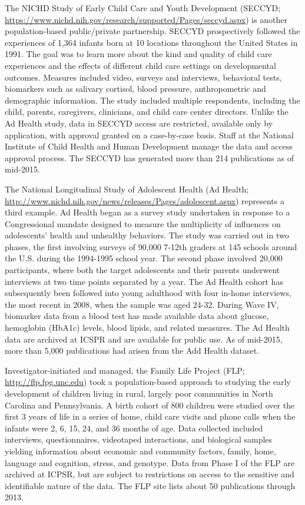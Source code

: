\documentclass[letterpaper,man,apacite]{apa6}
\begin{document}
The NICHD Study of Early Child Care and Youth Development (SECCYD; \url{https://www.nichd.nih.gov/research/supported/Pages/seccyd.aspx}) is another population-based public/private partnership.
SECCYD prospectively followed the experiences of 1,364 infants born at 10 locations throughout the United States in 1991.
The goal was to learn more about the kind and quality of child care experiences and the effects of different child care settings on developmental outcomes. 
Measures included video, surveys and interviews, behavioral tests, biomarkers such as salivary cortisol, blood pressure, anthropometric and demographic information.
The study included multiple respondents, including the child, parents, caregivers, clinicians, and child care center directors.
Unlike the Ad Health study, data in SECCYD access are restricted, available only by application, with approval granted on a case-by-case basis.
Staff at the National Institute of Child Health and Human Development manage the data and access approval process.
The SECCYD has generated more than 214 publications as of mid-2015.

The National Longitudinal Study of Adolescent Health (Ad Health; \url{http://www.nichd.nih.gov/news/releases/Pages/adolescent.aspx}) represents a third example.
Ad Health began as a survey study undertaken in response to a Congressional mandate designed to measure the multiplicity of influences on adolescents' health and unhealthy behaviors. 
The study was carried out in two phases, the first involving surveys of 90,000 7-12th graders at 145 schools around the U.S. during the 1994-1995 school year.
The second phase involved 20,000 participants, where both the target adolescents and their parents underwent interviews at two time points separated by a year. 
The Ad Health cohort has subsequently been followed into young adulthood with four in-home interviews, the most recent in 2008, when the sample was aged 24-32.
During Wave IV, biomarker data from a blood test has made available data about glucose, hemoglobin (HbA1c) levels, blood lipids, and related measures. 
The Ad Health data are archived at ICSPR and are available for public use.
As of mid-2015, more than 5,000 publications had arisen from the Add Health dataset.

Investigator-initiated and managed, the Family Life Project (FLP; \url{http://flp.fpg.unc.edu}) took a population-based approach to studying the early development of children living in rural, largely poor communities in North Carolina and Pennsylvania. 
A birth cohort of 800 children were studied over the first 3 years of life in a series of home, child care visits and phone calls when the infants were 2, 6, 15, 24, and 36 months of age. 
Data collected included interviews, questionnaires, videotaped interactions, and biological samples yielding information about economic and community factors, family, home, language and cognition, stress, and genotype.
Data from Phase I of the FLP are archived at ICPSR, but are subject to restrictions on access to the sensitive and identifiable nature of the data.
The FLP site lists about 50 publications through 2013.
\end{document}
